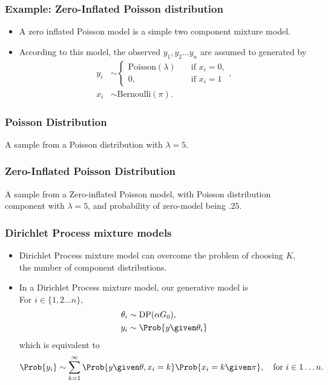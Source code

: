 \documentclass{slides}
\begin{document}
\begin{frame}
\frametitle{Example: Zero-Inflated Poisson distribution}
\begin{itemize}
\item A zero inflated Poisson model is a simple two component mixture model.
\item According to this model, the observed $y_1, y_2 \ldots y_n$ are assumed to generated by
\begin{align*}
y_i &\sim \begin{cases} \textrm{Poisson}(\lambda)\quad &\text{if $x_i=0$},\\ 0, \quad &\text{if $x_i=1$} \end{cases},\\
x_i &\sim \textrm{Bernoulli}(\pi).
\end{align*}
\end{itemize}
\end{frame}
	\begin{frame}
	\frametitle{Poisson Distribution}
	\noindent A sample from a Poisson distribution with $\lambda=5$.
	\vspace{-2\baselineskip}
	\begin{center}
	
	\end{center}
	\end{frame}


	\begin{frame}
	\frametitle{Zero-Inflated Poisson Distribution}
	\noindent A sample from a Zero-inflated Poisson model, with Poisson distribution component with $\lambda=5$, and probability of zero-model being $.25$.
	\vspace{-2\baselineskip}
	\begin{center}
	
	\end{center}
	\end{frame}



\begin{frame}
	\frametitle{Dirichlet Process mixture models}
	\begin{itemize}
		\item Dirichlet Process mixture model can overcome the problem of choosing $K$, the number of component distributions.
		\item In a Dirichlet Process mixture model, our generative model is
		\\For $i \in \{1, 2 \ldots n\}$,
		\begin{align*}
			\theta_i &\sim \mathrm{DP}(\alpha G_0),\\
			y_i &\sim \Prob{y\given \theta_i}
		\end{align*}
		which is equivalent to 
		\[
			\Prob{y_i} \sim \sum_{k=1}^\infty \Prob{y \given \theta, x_i=k}\Prob{x_i=k\given\pi}, \quad\text{for $i \in {1 \ldots n}$.}
		\]
	

	\end{itemize}
\end{frame}
\end{document}
